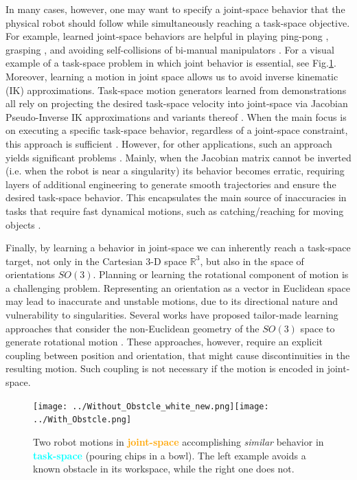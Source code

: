 \documentclass[letterpaper, 10 pt, journal, twoside, fleqn]{IEEEtran}
\begin{document}
In many cases, however, one may want to specify a joint-space behavior that the physical robot should follow while simultaneously reaching a task-space objective. For example, learned joint-space behaviors are helpful in playing ping-pong \cite{huang2016jointly}, grasping \cite{calinon2010learning}, and avoiding self-collisions of bi-manual manipulators \cite{silverio2017learning}. For a visual example of a task-space problem in which joint behavior is essential, see Fig.\ref{fig:robot_example}. Moreover, learning a motion in joint space allows us to avoid inverse kinematic (IK) approximations. Task-space motion generators learned from demonstrations all rely on projecting the desired task-space velocity into joint-space via Jacobian Pseudo-Inverse IK approximations and variants thereof \cite{kelly2006control}. When the main focus is on executing a specific task-space behavior, regardless of a joint-space constraint, this approach is sufficient \cite{figueroa2016HRIrolling,ureche2015taskconst}. However, for other applications, such an approach yields significant problems \cite{buss2004introduction}. Mainly, when the Jacobian matrix cannot be inverted (i.e. when the robot is near a singularity) its behavior becomes erratic, requiring layers of additional engineering to generate smooth trajectories and ensure the desired task-space behavior. This encapsulates the main source of inaccuracies in tasks that require fast dynamical motions, such as catching/reaching for moving objects \cite{7439839,Salehian-RSS-16}. 

Finally, by learning a behavior in joint-space we can inherently reach a task-space target, not only in the Cartesian 3-D space $\mathbb{R}^3$, but also in the space of orientations $SO(3)$. Planning or learning the rotational component of motion is a challenging problem. Representing an orientation as a vector in Euclidean space may lead to inaccurate and unstable motions, due to its directional nature and vulnerability to singularities. Several works have proposed tailor-made learning approaches that consider the non-Euclidean geometry of the $SO(3)$ space to generate rotational motion \cite{KIM201728} \cite{6907291} \cite{7829369}. These approaches, however, require an explicit coupling between position and orientation, that might cause discontinuities in the resulting motion. Such coupling is not necessary if the motion is encoded in joint-space. 
\begin{figure}[t]
\centering
\texttt{[image: ../Without\_Obstcle\_white\_new.png]}\texttt{[image: ../With\_Obstcle.png]}
\caption{Two robot motions in \textcolor{orange}{\textbf{joint-space}} accomplishing \textit{similar} behavior in \textcolor{cyan}{\textbf{task-space}} (pouring chips in a bowl). The left example avoids a known obstacle in its workspace, while the right one does not.}
\label{fig:robot_example}
\vspace{-20pt}
\end{figure}
\end{document}
